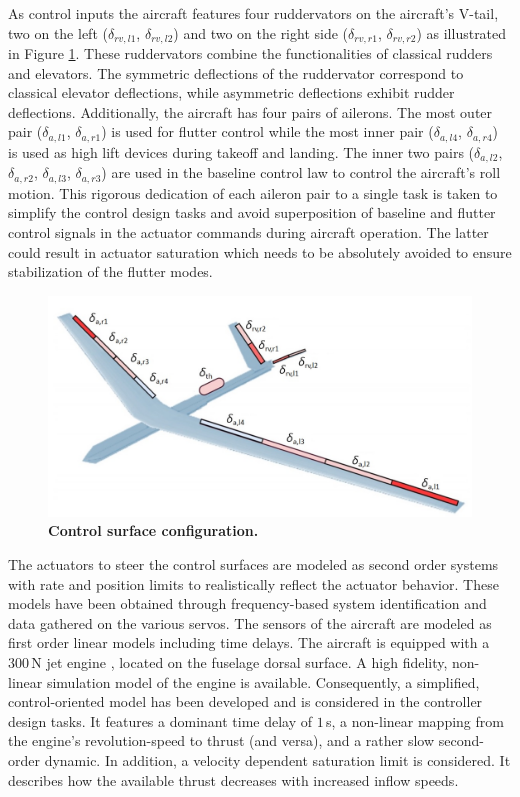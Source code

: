 \documentclass[aerospace,article,submit,moreauthors,pdftex,10pt,a4paper]{Definitions/mdpi}
\begin{document}
As control inputs the aircraft features four ruddervators on the aircraft's V-tail, two on the left ($\delta_{rv,l1}$, $\delta_{rv,l2}$) and two on the right side ($\delta_{rv,r1}$, $\delta_{rv,r2}$) as illustrated in Figure \ref{fig:ac_u}.  These ruddervators combine the functionalities of classical rudders and elevators. The symmetric deflections of the ruddervator correspond to classical elevator deflections, while asymmetric deflections exhibit rudder deflections. Additionally, the aircraft has four pairs of ailerons. The most outer pair ($\delta_{a,l1}$, $\delta_{a,r1}$) is used for flutter control while the most inner pair ($\delta_{a,l4}$, $\delta_{a,r4}$) is used as high lift devices during takeoff and landing. The inner two pairs ($\delta_{a,l2}$, $\delta_{a,r2}$, $\delta_{a,l3}$, $\delta_{a,r3}$) are used in the baseline control law to control the aircraft's roll motion. This rigorous dedication of each aileron pair to a single task is taken to simplify the control design tasks and avoid superposition of baseline and flutter control signals in the actuator commands during aircraft operation. The latter could result in actuator saturation which needs to be absolutely avoided to ensure stabilization of the flutter modes.

 \begin{figure}
	\centering
	\includegraphics[width=1\linewidth]{figs/ac_u.jpg}
	\caption{\textbf{Control surface configuration.}}
	\label{fig:ac_u}
\end{figure}
 The actuators to steer the control surfaces are modeled as second order systems with rate and position limits to realistically reflect the actuator behavior. 
 These  models have been obtained through frequency-based system identification and data gathered on the various servos. The sensors of the aircraft are modeled as first order linear models including time delays.
 The aircraft is equipped with a 300\,N jet engine \cite{Sendner17}, located on the fuselage dorsal surface.  A high fidelity, non-linear simulation model of the engine is available. Consequently, a simplified, control-oriented model has been developed and is considered in the controller design tasks. It features a dominant time delay of $1\,$s, a non-linear mapping from the engine's revolution-speed  to thrust  (and versa), and a rather slow second-order dynamic. In addition, a velocity dependent saturation limit is considered. It describes how the available thrust decreases with increased inflow speeds. 
\end{document}

